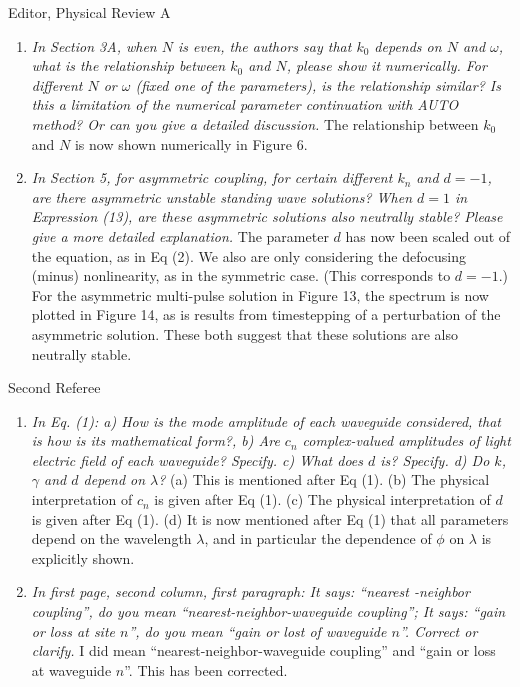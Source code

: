 \documentclass[11pt]{letter}
\begin{document}
\begin{letter}{Editor, Physical Review A}
\begin{enumerate}
\item \emph{In Section 3A, when $N$ is even, the authors say that $k_0$ depends on $N$ and $\omega$, what is the relationship between $k_0$ and $N$, please show it numerically. For different $N$ or $\omega$ (fixed one of the parameters), is the relationship similar? Is this a limitation of the numerical parameter continuation with AUTO method? Or can you give a detailed discussion.} The relationship between $k_0$ and $N$ is now shown numerically in Figure 6.

\item \emph{In Section 5, for asymmetric coupling, for certain different $k_{n}$ and $d=-1$, are there asymmetric unstable standing wave solutions? When $d=1$ in Expression (13), are these asymmetric solutions also neutrally stable? Please give a more detailed explanation.} The parameter $d$ has now been scaled out of the equation, as in Eq (2). We also are only considering the defocusing (minus) nonlinearity, as in the symmetric case. (This corresponds to $d=-1$.) For the asymmetric multi-pulse solution in Figure 13, the spectrum is now plotted in Figure 14, as is results from timestepping of a perturbation of the asymmetric solution. These both suggest that these solutions are also neutrally stable.

\end{enumerate}

Second Referee
\begin{enumerate}
\item \emph{In Eq. (1): a) How is the mode amplitude of each waveguide considered, that is how is its mathematical form?, b) Are $c_n$ complex-valued amplitudes of light electric field of each waveguide? Specify. c) What does $d$ is? Specify. d) Do $k$, $\gamma$ and $d$ depend on $\lambda$?} (a) This is mentioned after Eq (1). (b) The physical interpretation of $c_n$ is given after Eq (1). (c) The physical interpretation of $d$ is given after Eq (1). (d) It is now mentioned after Eq (1) that all parameters depend on the wavelength $\lambda$, and in particular the dependence of $\phi$ on $\lambda$ is explicitly shown.

\item \emph{In first page, second column, first paragraph: It says: ``nearest -neighbor coupling'', do you mean ``nearest-neighbor-waveguide coupling''; It says: ``gain or loss at site $n$'', do you mean ``gain or lost of waveguide $n$''. Correct or clarify.} I did mean ``nearest-neighbor-waveguide coupling'' and ``gain or loss at waveguide $n$''. This has been corrected.


\end{enumerate}
\end{letter}
\end{document}
